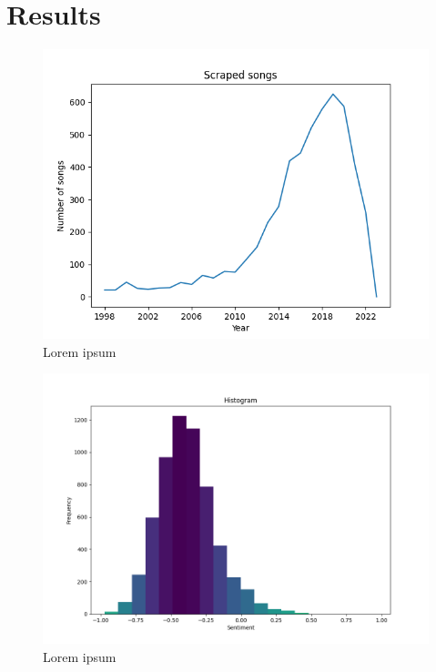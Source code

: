 \section{Results}\label{sec:results}

\begin{figure}[!htb]
    \centering
    \includegraphics[width=\textwidth]{figures/number_of_songs.png}
    \caption[]{Lorem ipsum}
\end{figure}

\begin{figure}[!htb]
    \centering
    \includegraphics[width=\textwidth]{figures/sentiment_histogram.png}
    \caption[]{Lorem ipsum}
\end{figure}

